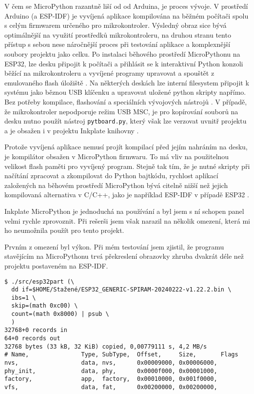 V čem se MicroPython razantně liší od od Arduina, je proces vývoje. V prostředí Arduino (a ESP-IDF) je vyvíjená aplikace kompilována na běžném počítači spolu s celým firmwarem určeného pro mikrokontroler. Výsledný obraz sice bývá optimálnější na využití prostředků mikrokontroleru, na druhou stranu tento přístup s sebou nese náročnější proces při testování aplikace a komplexnější soubory projektu jako celku. Po instalaci běhového prostředí MicroPythonu na ESP32, lze desku připojit k počítači a přihlásit se k interaktivní Python konzoli běžící na mikrokontroleru a vyvíjené programy upravovat a spouštět z emulovaného flash úložiště \cite{MicroPythonPythonMicrocontrollers}. Na některých deskách lze interní filesystem připojit k systému jako běznou USB klíčenku a upravovat uložené python skripty napřímo. Bez potřeby kompilace, flashování a speciálních vývojových nástrojů \cite{WorkingFilesystemsMicroPython}. V případě, že mikrokontroler nepodporuje režim USB MSC, je pro kopírování souborů na desku nutno použít nástroj \lstinline|pytboard.py|, který však lze verzovat uvnitř projektu a je obsažen i v projektu Inkplate knihovny \cite{PyboardPyTool}.

Protože vyvíjená aplikace nemusí projít kompilací před jejím nahráním na desku, je kompilátor obsažen v MicroPython firmwaru. To má vliv na použitelnou velikost flash paměti pro vyvíjený program. Stejně tak tím, že je nutné skripty při načítání zpracovat a zkompilovat do Python bajtkódu, rychlost aplikací založených na běhovém prostředí MicroPython bývá citelně nižší než jejich kompilovaná alternativa v C/C++, jako je například ESP-IDF v případě ESP32 \cite{plauskaPerformanceEvaluationMicroPython2022}.

Inkplate MicroPython je jednoduchá na používání a byl jsem s ní schopen panel velmi rychle zprovoznit. Při rešerši jsem však narazil na několik omezení, která mi ho neumožnila použít pro tento projekt.

Prvním z omezení byl výkon. Při mém testování jsem zjistil, že programu stavějícím na MicroPythonu trvá překreslení obrazovky zhruba dvakrát déle než projektu postaveném na ESP-IDF. 

\begin{lstlisting}[label=src:micropython-spiram-partition-table,caption={Tabulka oddílů vyčtena z MicroPython firmwaru pomocí nástroje esp32part}]
$ ./src/esp32part (\
  dd if=$HOME/Stažené/ESP32_GENERIC-SPIRAM-20240222-v1.22.2.bin \
  ibs=1 \
  skip=(math 0xc00) \
  count=(math 0x8000) | psub \
  )
32768+0 records in
64+0 records out
32768 bytes (33 kB, 32 KiB) copied, 0,00779111 s, 4,2 MB/s
# Name,               Type, SubType,  Offset,     Size,       Flags
nvs,                  data, nvs,      0x00009000, 0x00006000, 
phy_init,             data, phy,      0x0000f000, 0x00001000, 
factory,              app,  factory,  0x00010000, 0x001f0000, 
vfs,                  data, fat,      0x00200000, 0x00200000,
\end{lstlisting}

